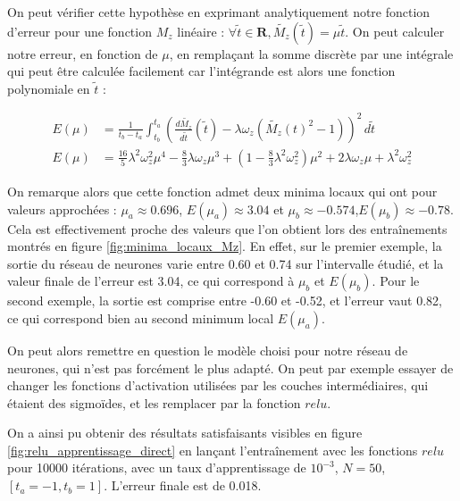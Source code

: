 \documentclass[12pt]{report}
\begin{document}
On peut vérifier cette hypothèse en exprimant analytiquement notre fonction d'erreur pour une fonction $M_z$ linéaire : $\forall \tilde{t} \in \mathbf{R}, \tilde{M_z}(\tilde{t}) = \mu  \tilde{t}$.
On peut calculer notre erreur, en fonction de $\mu$, en remplaçant la somme discrète par une intégrale qui peut être calculée facilement car
l'intégrande est alors une fonction polynomiale en $\tilde{t}$ :

\begin{equation}
    \begin{aligned}
        E(\mu) & = \frac{1}{t_b-t_a}\int_{t_b}^{t_a} (\frac{d\tilde{M_z}}{d\tilde{t}}(\tilde{t})-\lambda \omega_z (\tilde{M_z}(t)^2-1))^2 \,d \tilde{t} \\
        E(\mu) & = \frac{16}{5}\lambda^2\omega_z^2\mu^4
        - \frac{8}{3}\lambda\omega_z\mu^3
        + (1- \frac{8}{3}\lambda^2\omega_z^2)\mu^2
        + 2\lambda\omega_z\mu
        + \lambda^2\omega_z^2
    \end{aligned}
    \label{eq:fonction_erreur_analytique_M_z_lineaire}
\end{equation}

On remarque alors que cette fonction admet deux minima locaux qui ont pour valeurs approchées : $ \mu_a \approx 0.696$, $E(\mu_a) \approx 3.04$ et $\mu_b \approx -0.574$,$ E(\mu_b) \approx -0.78$.
Cela est effectivement proche des valeurs que l'on obtient lors des entraînements montrés en figure \ref{fig:minima_locaux_Mz}.
En effet, sur le premier exemple, la sortie du réseau de neurones varie entre 0.60 et 0.74 sur l'intervalle étudié, et la valeur finale de l'erreur est 3.04, ce qui correspond à $\mu_b$ et $E(\mu_b)$.
Pour le second exemple, la sortie est comprise entre -0.60 et -0.52, et l'erreur vaut 0.82, ce qui correspond bien au second minimum local $E(\mu_a)$.

On peut alors remettre en question le modèle choisi pour notre réseau de neurones, qui n'est pas forcément le plus adapté.
On peut par exemple essayer de changer les fonctions d'activation utilisées par les couches intermédiaires, qui étaient des sigmoïdes, et les remplacer par la fonction $relu$.

On a ainsi pu obtenir des résultats satisfaisants visibles en figure \ref{fig:relu_apprentissage_direct} en lançant l'entraînement avec les fonctions $relu$ pour 10000 itérations, avec un taux d'apprentissage de $10^{-3}$, $N=50$, $[t_a = -1, t_b = 1]$.
L'erreur finale est de 0.018.
\end{document}
